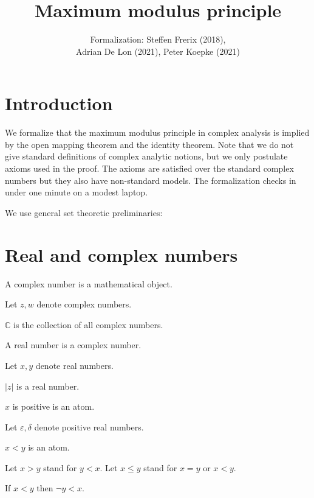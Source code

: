 \documentclass{article}
\title{Maximum modulus principle}
\author{\Naproche{} Formalization: Steffen Frerix (2018),\\
Adrian De Lon (2021), Peter Koepke (2021)}
\date{}
\begin{document}

\maketitle


\section{Introduction}

\noindent
We formalize that the maximum modulus principle in complex analysis is
implied by the open mapping theorem and the identity theorem.
Note that we do not give standard definitions of complex analytic notions,
but we only postulate axioms used in the proof. The axioms are satisfied over
the standard complex numbers but they also have non-standard models.
The formalization checks in under one minute on a modest laptop.

We use general set theoretic preliminaries:

\begin{forthel}
\end{forthel}

\section{Real and complex numbers}

\begin{forthel}
\begin{signature}
  A complex number is a mathematical object.
\end{signature}

Let $z, w$ denote complex numbers.

\begin{definition}
  $\mathbb{C}$ is the collection of all complex numbers.
\end{definition}

\begin{signature}
  A real number is a complex number.
\end{signature}

Let $x,y$ denote real numbers.

\begin{signature}
  $|z|$ is a real number.
\end{signature}

\begin{signature}
  $x$ is positive is an atom.
\end{signature}

Let $\varepsilon, \delta$ denote positive real numbers.

\begin{signature}
  $x < y$ is an atom.
\end{signature}
Let $x > y$ stand for $y < x$.
Let $x \leq y$ stand for $x = y$ or $x < y$.

\begin{axiom}
  If $x < y$ then $\neg y < x$.
\end{axiom}
\end{forthel}
\end{document}
